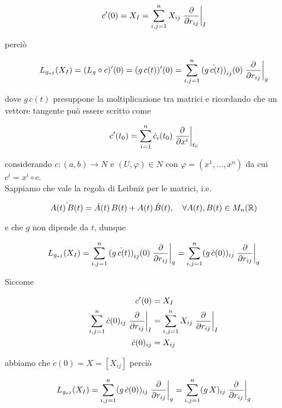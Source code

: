 \begin{equation}
	c'(0) = X_{I} = \sum_{i,j=1}^{n} X_{ij} \eval{ \pdv{r_{ij}} }_{I}
\end{equation}

perciò

\begin{equation}
	L_{g_{*I}}(X_{I}) = (L_{g} \circ c)'(0) %
	= (g \, c(t))'(0) %
	= \sum_{i,j=1}^{n} \dot{(g \, c(t))}_{ij}(0) \eval{ \pdv{r_{ij}} }_{g}
\end{equation}

dove $ g \, c(t) $ presuppone la moltiplicazione tra matrici e ricordando che un vettore tangente può essere scritto come

\begin{equation}
	c'(t_{0}) = \sum_{i=1}^{n} \dot{c}_{i}(t_{0}) \eval{ \pdv{x^{i}} }_{t_{0}}
\end{equation}

considerando $ c : (a,b) \to N $ e $ (U,\varphi) \in N $ con $ \varphi=(x^{1},\dots,x^{n}) $ da cui $ c^{i} = x^{i} \circ c $. \\
Sappiamo che vale la regola di Leibniz per le matrici, i.e.

\begin{equation}
	\dot{A(t) \, B(t)} = \dot{A}(t) \, B(t) + A(t) \, \dot{B}(t) \qcomma \forall A(t),B(t) \in M_{n}(\R)
\end{equation}

e che $ g $ non dipende da $ t $, dunque

\begin{equation}
	L_{g_{*I}}(X_{I}) = \sum_{i,j=1}^{n} \dot{(g \, c(t))}_{ij}(0) \eval{ \pdv{r_{ij}} }_{g} %
	= \sum_{i,j=1}^{n} (g \, \dot{c}(0))_{ij} \eval{ \pdv{r_{ij}} }_{g}
\end{equation}

Siccome

\begin{align}
	\begin{split}
		c'(0) &= X_{I} \\
		\sum_{i,j=1}^{n} \dot{c}(0)_{ij} \eval{ \pdv{r_{ij}} }_{I} &= \sum_{i,j=1}^{n} X_{ij} \eval{ \pdv{r_{ij}} }_{I} \\
		\dot{c}(0)_{ij} &= X_{ij}
	\end{split}
\end{align}

abbiamo che $ \dot{c}(0) = X = [X_{ij}] $ perciò

\begin{equation}
	L_{g_{*I}}(X_{I}) = \sum_{i,j=1}^{n} (g \, \dot{c}(0))_{ij} \eval{ \pdv{r_{ij}} }_{g} %
	= \sum_{i,j=1}^{n} (g \, X)_{ij} \eval{ \pdv{r_{ij}} }_{g}
\end{equation}

